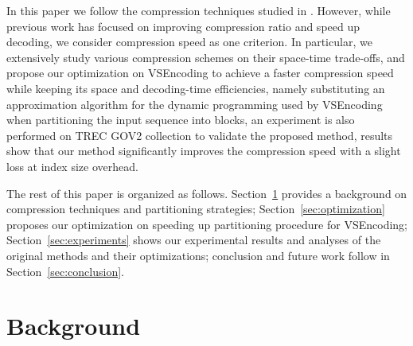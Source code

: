 \documentclass[runningheads,a4paper]{llncs}
\begin{document}
In this paper we follow the compression techniques studied in \cite{catena2014inverted,lemire2015decoding,trotman2014compression,yan2009inverted}. However, while previous work has focused on improving compression ratio and speed up decoding, we consider compression speed as one criterion. In particular, we extensively study various compression schemes on their space-time trade-offs, and propose our optimization on VSEncoding to achieve a faster compression speed while keeping its space and decoding-time efficiencies, namely substituting an approximation algorithm for the dynamic programming used by VSEncoding\cite{silvestri2010vsencoding} when partitioning the input sequence into blocks, an experiment is also performed on TREC GOV2 collection to validate the proposed method, results show that our method significantly improves the compression speed with a slight loss at index size overhead.

The rest of this paper is organized as follows. Section~\ref{sec:background} provides a background on compression techniques and partitioning strategies; Section~\ref{sec:optimization} proposes our optimization on speeding up partitioning procedure for VSEncoding; Section~\ref{sec:experiments} shows our experimental results and analyses of the original methods and their optimizations; conclusion and future work follow in Section~\ref{sec:conclusion}.

\section{Background}\label{sec:background}
\end{document}
